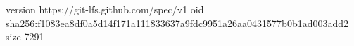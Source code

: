version https://git-lfs.github.com/spec/v1
oid sha256:f1083ea8df0a5d14f171a111833637a9fdc9951a26aa0431577b0b1ad003add2
size 7291
